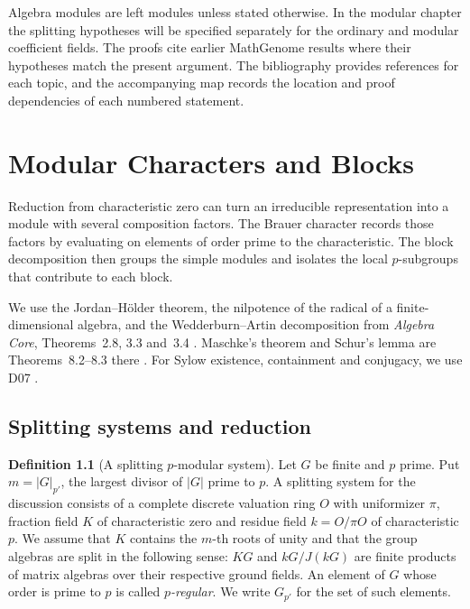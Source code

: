 \documentclass[11pt,oneside,openany]{book}
\theoremstyle{definition}
\newtheorem{definition}[theorem]{Definition}
\theoremstyle{remark}
\begin{document}
Algebra modules are left modules unless stated otherwise. In the
modular chapter the splitting hypotheses will be specified separately
for the ordinary and modular coefficient fields. The proofs cite
earlier MathGenome results where their hypotheses match the present
argument. The bibliography provides references for each topic, and
the accompanying map records the location and proof dependencies of
each numbered statement.

\mainmatter
\chapter{Modular Characters and Blocks}
\label{ch:modular-representations}

Reduction from characteristic zero can turn an irreducible
representation into a module with several composition factors.
The Brauer character records those factors by evaluating on
elements of order prime to the characteristic. The block
decomposition then groups the simple modules and isolates the
local \(p\)-subgroups that contribute to each block.

We use the Jordan--H\"older theorem, the nilpotence of the
radical of a finite-dimensional algebra, and the Wedderburn--Artin
decomposition from \emph{Algebra Core}, Theorems~2.8, 3.3 and~3.4
\cite[PDF pp.~11, 14--15]{mg-algebra-core}. Maschke's theorem and
Schur's lemma are Theorems~8.2--8.3 there
\cite[PDF pp.~38--39]{mg-algebra-core}.
For Sylow existence, containment and conjugacy, we use D07
\cite[PDF pp.~49--50]{mg-d07}.

\section{Splitting systems and reduction}

\begin{definition}[A splitting \(p\)-modular system]
\label{res:MR01}
Let \(G\) be finite and \(p\) prime. Put \(m=|G|_{p'}\), the
largest divisor of \(|G|\) prime to \(p\). A splitting system for
the discussion consists of a complete discrete valuation ring
\(O\) with uniformizer \(\pi\), fraction field \(K\) of
characteristic zero and residue field \(k=O/\pi O\) of
characteristic \(p\). We assume that \(K\) contains the \(m\)-th
roots of unity and that the group algebras are split in the
following sense: \(KG\) and \(kG/J(kG)\) are finite products
of matrix algebras over their respective ground fields.
An element of \(G\) whose order is prime to \(p\) is called
\emph{\(p\)-regular}. We write \(G_{p'}\) for the set of such
elements.
\end{definition}
\end{document}
